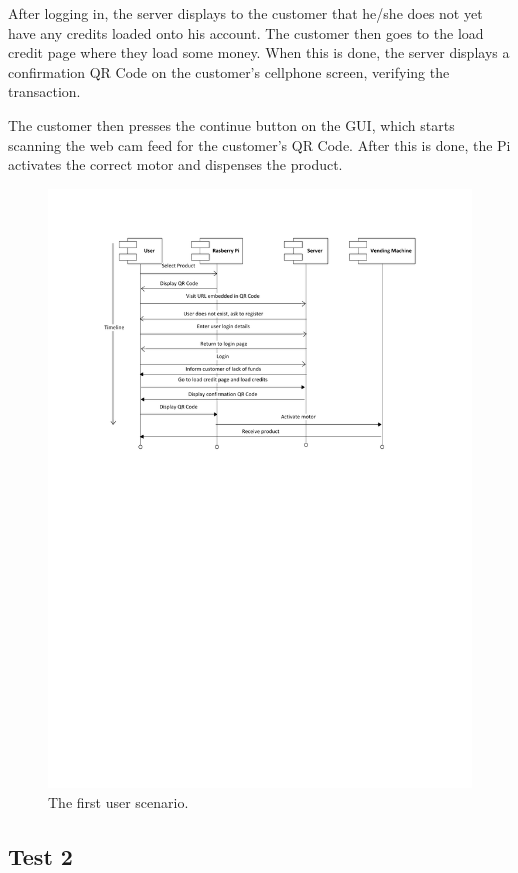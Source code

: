 After logging in, the server displays to the customer that he/she does not yet have any
credits loaded onto his account. The customer then goes to the load credit page where
they load some money. When this is done, the server displays a confirmation QR Code on
the customer's cellphone screen, verifying the transaction.

The customer then presses the continue button on the GUI, which starts scanning the web
cam feed for the customer's QR Code. After this is done, the Pi activates the correct
motor and dispenses the product.

\begin{figure}
 \centering 
 \includegraphics[clip=true, trim = 0 470 0 50,
 scale=0.7]{user_story_1}
 \caption{The first user scenario.}
 \label{fig:test1}
\end{figure}

\subsection{Test 2}

